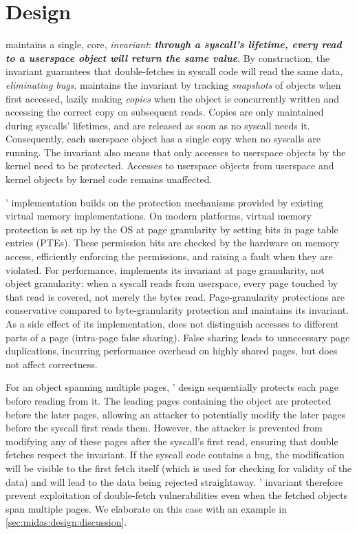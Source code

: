 \section{\midas Design}
\label{sec:midas:design}

\midas maintains a single, core, \emph{invariant}:
\textbf{\emph{through a syscall's lifetime, every read to a userspace object
will return the same value}}.
By construction, the invariant guarantees that double-fetches in syscall
code will read the same data, \emph{eliminating \tocttou bugs}.
\midas maintains the invariant by tracking \emph{snapshots} of objects
when first accessed, lazily making \emph{copies} when the object is concurrently
written and accessing the correct copy on subsequent reads.
Copies are only maintained during syscalls' lifetimes, and are released as
soon as no syscall needs it.
Consequently, each userspace object has a single copy when no syscalls are
running.
The invariant also means that only accesses to userspace objects by the kernel
need to be protected.
Accesses to userspace objects from userspace and kernel objects by kernel
code remains unaffected.

\midas' implementation builds on the protection mechanisms provided by
existing virtual memory implementations.
On modern platforms, virtual memory protection is set up by the OS at
page granularity by setting bits in page table entries (PTEs).
These permission bits are checked by the hardware on memory access,
efficiently enforcing the permissions, and raising a fault when they
are violated.
For performance, \midas implements its invariant at page granularity, not object
granularity: when a syscall reads from userspace, every page touched by that
read is covered, not merely the bytes read.
Page-granularity protections are conservative compared to byte-granularity
protection and \midas maintains its invariant.
As a side effect of its implementation, \midas does not distinguish
accesses to different parts of a page (intra-page false sharing).
False sharing leads to unnecessary page duplications, incurring performance
overhead on highly shared pages, but does not affect correctness.

For an object spanning multiple pages, \midas' design sequentially
protects each page before reading from it.
The leading pages containing the object are protected before the
later pages, allowing an attacker to potentially modify the later
pages before the syscall first reads them.
However, the attacker is prevented from modifying any of these pages
after the syscall's first read, ensuring that double fetches respect
the invariant.
If the syscall code contains a \tocttou bug, the modification will
be visible to the first fetch itself (which is used for checking for
validity of the data) and will lead to the data being rejected
straightaway.
\midas' invariant therefore prevent exploitation of double-fetch
vulnerabilities even when the fetched objects span multiple pages.
We elaborate on this case with an example in 
\autoref{sec:midas:design:discussion}.

